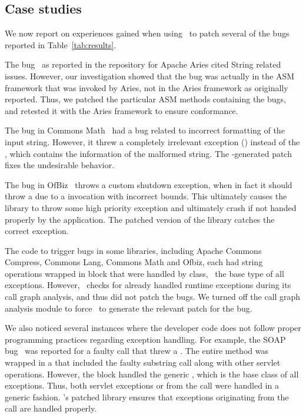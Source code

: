 \subsection{Case studies}
\label{sub:casestudies}

We now report on experiences gained when using \tool\ to patch several of the
bugs reported in Table~\ref{tab:results}.

\begin{mylist}

 \item The bug~\cite{ARIES1204} as reported in the repository for Apache Aries
cited String related issues. However, our investigation showed that the bug was
actually in the ASM framework that was invoked by Aries, not in the Aries framework as originally reported. Thus, we patched the
particular ASM methods containing the bugs, and retested it with the Aries
framework to ensure conformance.

 \item The bug in Commons Math~\cite{MATH198} had a bug related to incorrect
formatting of the input string. However, it threw a completely irrelevant
exception () instead of the ,
which contains the information of the malformed string. The \tool-generated
patch fixes the undesirable behavior.

 \item The bug in OfBiz~\cite{OFBIZ4237} throws a custom shutdown exception,
when in fact it should throw a  due to a
 invocation with incorrect bounds. This ultimately causes the
library to throw some high priority exception and ultimately crash if not handed
properly by the application. The patched version of the library catches the
correct exception.

 \item The code to trigger bugs in some libraries, including Apache Commons
Compress, Commons Lang, Commons Math and Ofbiz, each had string operations
wrapped in  block that were handled by  class,
\ie\ the base type of all exceptions. However, \tool\ checks for already
handled runtime exceptions during its call graph analysis, and thus did not
patch the bugs. We turned off the call graph analysis module to force \tool\ to
generate the relevant patch for the bug.

 \item We also noticed several instances where the developer code does not
follow proper programming practices regarding exception handling. For example,
the SOAP bug~\cite{SOAP130} was reported for a faulty  call that
threw a . The entire method was wrapped in
a  that included the faulty substring call along with other
servlet operations. However, the  block handled the generic
, which is the base class of all exceptions. Thus, both servlet
exceptions or  from the  call
were handled in a generic fashion. \tool's patched library ensures that
exceptions originating from the  call are handled properly.

\end{mylist}